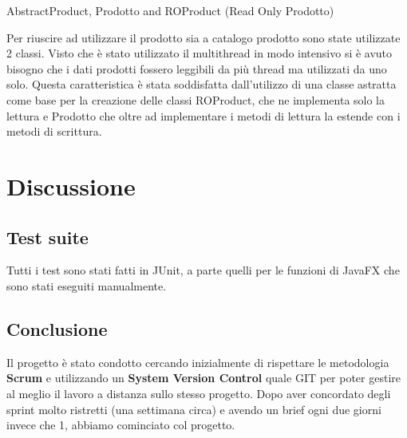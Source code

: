 \documentclass[12pt, a4paper]{report}
\begin{document}
AbstractProduct, Prodotto and ROProduct (Read Only Prodotto)

Per riuscire ad utilizzare il prodotto sia a catalogo prodotto sono state utilizzate 2 classi. 
Visto che è stato utilizzato il multithread in modo intensivo si è avuto bisogno che i dati prodotti fossero leggibili da più thread ma utilizzati da uno solo. Questa caratteristica è stata soddisfatta dall'utilizzo di una classe astratta come base per la creazione delle classi ROProduct, che ne implementa solo la lettura e Prodotto che oltre ad implementare i metodi di lettura la estende con i metodi di scrittura.

\chapter{Discussione}

\section{Test suite}

Tutti i test sono stati fatti in JUnit, a parte quelli per le funzioni di
JavaFX che sono stati eseguiti manualmente.



\section{Conclusione}

Il progetto è stato condotto cercando inizialmente di rispettare le metodologia
\textbf{Scrum} e utilizzando un \textbf{System Version Control} quale GIT per
poter gestire al meglio il lavoro a distanza sullo stesso progetto. Dopo aver
concordato degli sprint molto ristretti (una settimana circa) e avendo un brief
ogni due giorni invece che 1, abbiamo cominciato col progetto.
\end{document}
